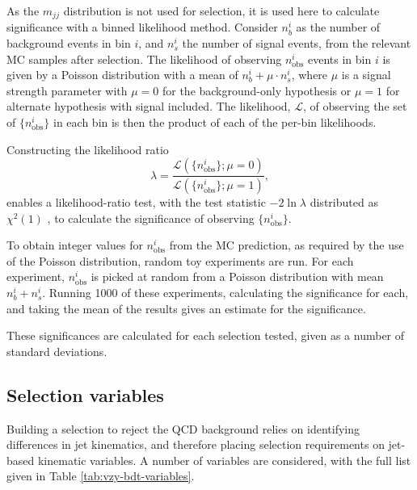 \newcommand\nobsi{\ensuremath{n_\text{obs}^i}\xspace}
As the $m_{jj}$ distribution is not used for selection, it is used here to
calculate significance with a binned likelihood method. Consider $n_b^i$ as the
number of background events in bin $i$, and $n_s^i$ the number of signal events,
from the relevant \ac{MC} samples after selection.  The likelihood of observing
\nobsi events in bin $i$ is given by a Poisson distribution with a mean of
$n_b^i + \mu\cdot n_s^i$, where $\mu$ is a signal strength parameter with
$\mu=0$ for the background-only hypothesis or $\mu=1$ for alternate hypothesis
with signal included. The likelihood, $\mathcal{L}$, of observing the set of
$\{\nobsi\}$ in each bin is then the product of each of the per-bin likelihoods.

Constructing the likelihood ratio
\begin{equation*}
  \mathscr{\lambda} = \frac{ \mathcal{L}( \{\nobsi\} ; \mu=0 ) }
                           { \mathcal{L}( \{\nobsi\} ; \mu=1 ) },
\end{equation*}
enables a likelihood-ratio test, with the test statistic $-2\ln\lambda$
distributed as $\chi^2(1)$ \cite{Wilks1938}, to calculate the significance of
observing $\{\nobsi\}$.

To obtain integer values for \nobsi from the \ac{MC} prediction, as required by
the use of the Poisson distribution, random toy experiments are run. For each
experiment, \nobsi is picked at random from a Poisson distribution with mean
$n_b^i + n_s^i$. Running 1000 of these experiments, calculating the significance
for each, and taking the mean of the results gives an estimate for the
significance.

These significances are calculated for each selection tested, given as a number
of standard deviations.

\subsection{Selection variables}

Building a selection to reject the \ac{QCD} \Zy background relies on identifying
differences in jet kinematics, and therefore placing selection requirements on
jet-based kinematic variables. A number of variables are considered, with the
full list given in Table \ref{tab:vzy-bdt-variables}.

